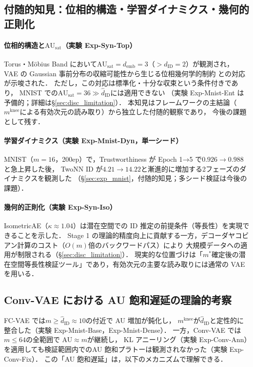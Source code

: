 \documentclass[11pt,a4paper]{jsarticle}
\newcommand{\dID}{d_{\mathrm{ID}}}
\newcommand{\dzopt}{m^*}
\newcommand{\kap}{\kappa}
\newcommand{\AUsat}{\mathrm{AU}_{\mathrm{sat}}}
\newcommand{\mknee}{m^{\mathrm{knee}}}
\newcommand{\demb}{d_{\mathrm{emb}}}
\begin{document}
\subsection{付随的知見：位相的構造・学習ダイナミクス・幾何的正則化}\label{sec:disc_incidental}

\paragraph{位相的構造と$\AUsat$（実験 Exp-Syn-Top）}
Torus・Möbius Band において$\AUsat = \demb = 3$（$> \dID = 2$）が観測され，
VAE の Gaussian 事前分布の収縮可能性から生じる位相幾何学的制約
\cite{hatcher2002algebraic,guillemin1974differential}との対応が示唆された．
ただし，この対応は標準化・十分な収束という条件付きであり，
MNIST での$\AUsat = 36 \gg \hat{d}_\mathrm{ID}$には適用できない
（実験 Exp-Mnist-Ent は予備的；詳細は§\ref{sec:disc_limitation}）．
本知見はフレームワークの主結論（$\mknee$による有効次元の読み取り）から独立した付随的観察であり，
今後の課題として残す．

\paragraph{学習ダイナミクス（実験 Exp-Mnist-Dyn，単一シード）}
MNIST（$m=16$，200ep）で，Trustworthiness が Epoch 1→5 で$0.926 \to 0.988$と急上昇した後，
TwoNN ID が$4.21 \to 14.22$と漸進的に増加する2フェーズのダイナミクスを観測した
（§\ref{sec:exp_mnist}，付随的知見；多シード検証は今後の課題）．

\paragraph{幾何的正則化（実験 Exp-Syn-Iso）}
IsometricAE（$\kap \approx 1.04$）は潜在空間での ID 推定の前提条件（等長性）を実現できることを示した．
Stage 1 の理論的精度向上に貢献する一方，デコーダヤコビアン計算のコスト（$O(m)$倍のバックワードパス）により
大規模データへの適用が制限される（§\ref{sec:disc_limitation}）．
現実的な位置づけは「$\dzopt$確定後の潜在空間等長性検証ツール」であり，有効次元の主要な読み取りには通常の VAE を用いる．

\subsection{Conv-VAE における AU 飽和遅延の理論的考察}\label{sec:disc_convvae}

FC-VAE では$m \geq \hat{d}_\mathrm{ID} \approx 10$の付近で AU 増加が鈍化し，
$\mknee$が$\hat{d}_\mathrm{ID}$と定性的に整合した（実験 Exp-Mnist-Base，Exp-Mnist-Dense）．
一方，Conv-VAE では$m \leq 64$の全範囲で AU$\approx m$が継続し，
KL アニーリング（実験 Exp-Conv-Ann）を適用しても検証範囲内でのAU 飽和プラトーは観測されなかった（実験 Exp-Conv-Fix）．
この「AU 飽和遅延」は，以下のメカニズムで理解できる．
\end{document}
